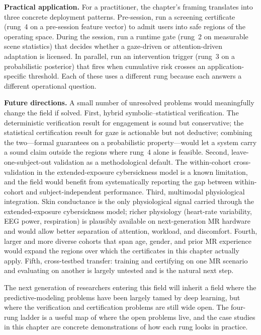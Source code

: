 \documentclass[graybox]{svmult}
\begin{document}
\textbf{Practical application.} For a practitioner, the chapter's framing translates into three concrete deployment patterns. Pre-session, run a screening certificate (rung~4 on a pre-session feature vector) to admit users into safe regions of the operating space. During the session, run a runtime gate (rung~2 on measurable scene statistics) that decides whether a gaze-driven or attention-driven adaptation is licensed. In parallel, run an intervention trigger (rung~3 on a probabilistic posterior) that fires when cumulative risk crosses an application-specific threshold. Each of these uses a different rung because each answers a different operational question.

\textbf{Future directions.} A small number of unresolved problems would meaningfully change the field if solved. First, hybrid symbolic--statistical verification. The deterministic verification result for engagement is sound but conservative; the statistical certification result for gaze is actionable but not deductive; combining the two---formal guarantees on a probabilistic property---would let a system carry a sound claim outside the regions where rung~4 alone is feasible. Second, leave-one-subject-out validation as a methodological default. The within-cohort cross-validation in the extended-exposure cybersickness model is a known limitation, and the field would benefit from systematically reporting the gap between within-cohort and subject-independent performance. Third, multimodal physiological integration. Skin conductance is the only physiological signal carried through the extended-exposure cybersickness model; richer physiology (heart-rate variability, EEG power, respiration) is plausibly available on next-generation MR hardware and would allow better separation of attention, workload, and discomfort. Fourth, larger and more diverse cohorts that span age, gender, and prior MR experience would expand the regions over which the certificates in this chapter actually apply. Fifth, cross-testbed transfer: training and certifying on one MR scenario and evaluating on another is largely untested and is the natural next step.

The next generation of researchers entering this field will inherit a field where the predictive-modeling problems have been largely tamed by deep learning, but where the verification and certification problems are still wide open. The four-rung ladder is a useful map of where the open problems live, and the case studies in this chapter are concrete demonstrations of how each rung looks in practice.
\end{document}
